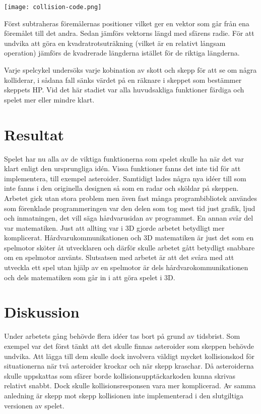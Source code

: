 \documentclass[12pt, a4paper]{article}
\begin{document}
	\texttt{[image: collision-code.png]}
	
	Först subtraheras föremålernas positioner vilket ger en vektor som går från ena föremålet till det andra. Sedan jämförs vektorns längd med sfärens radie. För att undvika att göra en kvadratrotsuträkning (vilket är en relativt långsam operation) jämförs de kvadrerade längderna istället för de riktiga längderna. 
	
	Varje spelcykel undersöks varje kobination av skott och skepp för att se om några kolliderar, i sådana fall sänks värdet på en räknare i skeppet som bestämmer skeppets HP. Vid det här stadiet var alla huvudsakliga funktioner färdiga och spelet mer eller mindre klart. 
	
	\newpage
	\section{Resultat}
	
	Spelet har nu alla av de viktiga funktionerna som spelet skulle ha när det var klart enligt den ursprungliga idén. Vissa funktioner fanns det inte tid för att implementera, till exempel asteroider. Samtidigt lades några nya idéer till som inte fanns i den originella designen så som en radar och sköldar på skeppen. Arbetet gick utan stora problem men även fast många programbibliotek användes som förenklade programmeringen var den delen som tog mest tid just grafik, ljud och inmatningen, det vill säga hårdvarusidan av programmet. En annan svår del var matematiken. Just att allting var i 3D gjorde arbetet betydligt mer komplicerat. Hårdvarukommunikationen och 3D matematiken är just det som en spelmotor sköter åt utvecklaren och därför skulle arbetet gått betydligt snabbare om en spelmotor använts. Slutsatsen med arbetet är att det svåra med att utveckla ett spel utan hjälp av en spelmotor är dels hårdvarokommunikationen och dels matematiken som går in i att göra spelet i 3D. 
	
	\newpage
	\section{Diskussion}
	
	Under arbetets gång behövde flera idéer tas bort på grund av tidsbrist. Som exempel var det först tänkt att det skulle finnas asteroider som skeppen behövde undvika. Att lägga till dem skulle dock involvera väldigt mycket kollisionskod för situationerna när två asteroider krockar och när skepp kraschar. Då asteroiderna skulle uppskattas som sfärer borde kollisionsupptäckarkoden kunna skrivas relativt snabbt. Dock skulle kollisionsresponsen vara mer komplicerad. Av samma anledning är skepp mot skepp kollisionen inte implementerad i den slutgiltiga versionen av spelet. 
	
\end{document}
